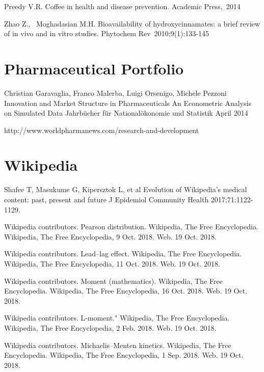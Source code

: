 \begin{thebibliography}{00}
Preedy V.R. 
\newblock Coffee in health and disease prevention. 
\newblock Academic Press, 2014

Zhao Z.,  Moghadasian M.H. 
\newblock Bioavailability of hydroxycinnamates: a brief review of in vivo and in vitro studies. 
\newblock Phytochem Rev 2010;9(1):133-145
\section{Pharmaceutical Portfolio}

 Christian Garavaglia, Franco Malerba, Luigi Orsenigo, Michele Pezzoni
\newblock Innovation and Market Structure in Pharmaceuticals An Econometric Analysis on Simulated Data
\newblock Jahrbücher für Nationalökonomie und Statistik April 2014

 http://www.worldpharmanews.com/research-and-development
\section{Wikipedia}

 Shafee T, Masukume G, Kipersztok L, et al
\newblock Evolution of Wikipedia’s medical content: past, present and future
\newblock J Epidemiol Community Health 2017;71:1122-1129.

 Wikipedia contributors. 
\newblock Pearson distribution. 
\newblock Wikipedia, The Free Encyclopedia. Wikipedia, The Free Encyclopedia, 9 Oct. 2018. Web. 19 Oct. 2018. 

 Wikipedia contributors. 
\newblock Lead–lag effect.
\newblock Wikipedia, The Free Encyclopedia. Wikipedia, The Free Encyclopedia, 11 Oct. 2018. Web. 19 Oct. 2018. 

 Wikipedia contributors. 
\newblock Moment (mathematics). Wikipedia, The Free Encyclopedia. 
\newblock Wikipedia, The Free Encyclopedia, 16 Oct. 2018. Web. 19 Oct. 2018. 

 Wikipedia contributors. 
\newblock L-moment." Wikipedia, The Free Encyclopedia. 
\newblock Wikipedia, The Free Encyclopedia, 2 Feb. 2018. Web. 19 Oct. 2018. 

 Wikipedia contributors. 
\newblock Michaelis–Menten kinetics. 
\newblock Wikipedia, The Free Encyclopedia. Wikipedia, The Free Encyclopedia, 1 Sep. 2018. Web. 19 Oct. 2018. 


\end{thebibliography}
